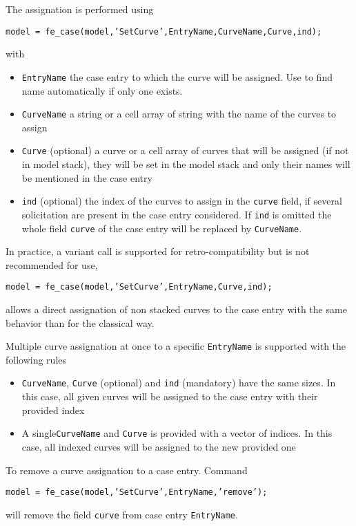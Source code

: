 The assignation is performed using 

{\tt model = fe\_case(model,'SetCurve',EntryName,CurveName,Curve,ind);}

with
\begin{itemize}
\item {\tt EntryName} the case entry to which the curve will be assigned. Use  to find name automatically if only one exists. 
\item {\tt CurveName} a string or a cell array of string with the name of the curves to assign
\item {\tt Curve} (optional)  a curve or a cell array of curves that will be assigned (if not in model stack), they will be set in the model stack and only their names will be mentioned in the case entry
\item {\tt ind} (optional) the index of the curves to assign in the {\tt curve} field, if several solicitation are present in the case entry considered. If {\tt ind} is omitted the whole field {\tt curve} of the case entry will be replaced by {\tt CurveName}.
\end{itemize}

In practice, a variant call is supported for retro-compatibility but is not recommended for use,

{\tt model = fe\_case(model,'SetCurve',EntryName,Curve,ind);}

allows a direct assignation of non stacked curves to the case entry with the same behavior than for the classical way.

\vs

Multiple curve assignation at once to a specific {\tt EntryName} is supported with the following rules
\begin{itemize}
\item {\tt CurveName}, {\tt Curve} (optional) and {\tt ind} (mandatory) have the same sizes. In this case, all given curves will be assigned to the case entry with their provided index
\item A single{\tt CurveName} and {\tt Curve} is provided with a vector of indices. In this case, all indexed curves will be assigned to the new provided one
\end{itemize}

\vs

To remove a curve assignation to a case entry. Command

{\tt model = fe\_case(model,'SetCurve',EntryName,'remove');}

will remove the field {\tt curve} from case entry {\tt EntryName}.


